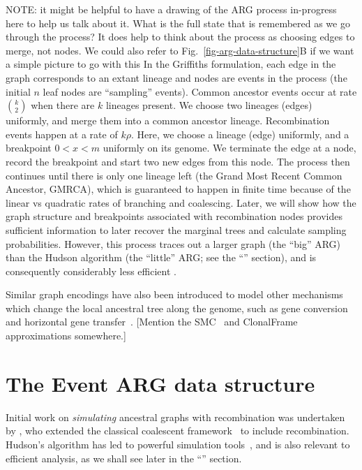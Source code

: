 \documentclass{article}
\begin{document}
NOTE: it might be helpful to have a drawing of the ARG process
in-progress here to help us talk about it. What is the full state
that is remembered as we go through the process? It does help to think
about the process as choosing edges to merge, not nodes.
We could also refer to Fig.~\ref{fig-arg-data-structure}B if we want a simple picture
to go with this
In the Griffiths formulation, each edge in the graph corresponds to an extant
lineage and nodes are events in the process (the initial $n$ leaf nodes are
``sampling'' events). Common ancestor events occur at rate $\binom{k}{2}$ when there
are $k$ lineages present. We choose two lineages (edges) uniformly, and merge them
into a common ancestor lineage. Recombination events happen at a rate of
$k \rho$. Here, we choose a lineage (edge) uniformly, and a
breakpoint $0 < x < m$ uniformly on its genome. We terminate the edge at a
node, record the breakpoint and start two new edges from this node. The process
then continues until there is only one lineage left (the Grand Most Recent
Common Ancestor, GMRCA), which is guaranteed to
happen in finite time because of the linear vs quadratic rates of branching
and coalescing. Later, we will show how the graph structure and breakpoints
associated with
recombination nodes provides sufficient information to later recover the marginal
trees and calculate sampling probabilities. However, this process traces out
a larger graph (the ``big'' ARG) than the Hudson algorithm (the ``little'' ARG; see the ``'' section),
and is consequently considerably less efficient \citep{wiuf1999ancestry}.

Similar graph encodings have also been introduced to model other mechanisms
which change the local ancestral tree along the genome, such as gene
conversion~\citep{wiuf2000coalescent} and
horizontal gene transfer~\citep{baumdicker2014infinitely}.
[Mention the
SMC~\citep{mcvean2005approximating,marjoram2006fast}
and ClonalFrame~\citep{didelot2007inference} approximations somewhere.]

\section*{The Event ARG data structure}\label{eARG}
Initial work on \emph{simulating} ancestral graphs with recombination was undertaken by
\citet{hudson1983properties,hudson1990gene}, who extended the classical coalescent
framework~\citep{kingman1982coalescent,kingman1982genealogy, hudson1983testing, tajima1983evolutionary}
to include recombination. Hudson's algorithm has led to powerful simulation
tools~\citep{hudson2002generating,kelleher2016efficient, baumdicker2021efficient}, and is
also relevant to efficient analysis, as we shall see later in the
``'' section.
\end{document}
